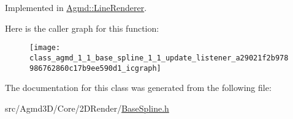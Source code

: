 Implemented in \hyperlink{class_agmd_1_1_line_renderer_a15870f58e43918b31fc3be61b6b3e825}{Agmd\+::\+Line\+Renderer}.



Here is the caller graph for this function\+:\nopagebreak
\begin{figure}[H]
\begin{center}
\leavevmode
\texttt{[image: class\_agmd\_1\_1\_base\_spline\_1\_1\_update\_listener\_a29021f2b978986762860c17b9ee590d1\_icgraph]}
\end{center}
\end{figure}




The documentation for this class was generated from the following file\+:\begin{DoxyCompactItemize}
\item 
src/\+Agmd3\+D/\+Core/2\+D\+Render/\hyperlink{_base_spline_8h}{Base\+Spline.\+h}\end{DoxyCompactItemize}
